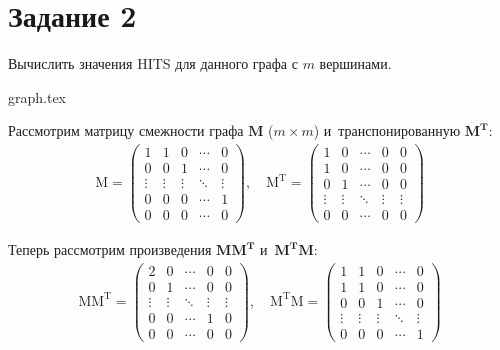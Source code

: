\documentclass[class=article,crop=false]{standalone}
\begin{document}
    \section*{Задание 2}
    Вычислить значения HITS для данного графа с $m$ вершинами.

    \begin{figure*}[h]
        \centering
        {graph.tex}
    \end{figure*}

    \noindent Рассмотрим матрицу смежности графа $\mathbf{M}$ ($m\times m$) и~транспонированную $\mathbf{M^T}$:
    \begin{gather*}
        \mathrm{M}=
        \begin{pmatrix}
            1      & 1      & 0      & \cdots & 0      \\
            0      & 0      & 1      & \cdots & 0      \\
            \vdots & \vdots & \vdots & \ddots & \vdots \\
            0      & 0      & 0      & \cdots & 1      \\
            0      & 0      & 0      & \cdots & 0
        \end{pmatrix},\quad
        \mathrm{M^T}=
        \begin{pmatrix}
            1      & 0      & \cdots & 0      & 0      \\
            1      & 0      & \cdots & 0      & 0      \\
            0      & 1      & \cdots & 0      & 0      \\
            \vdots & \vdots & \ddots & \vdots & \vdots \\
            0      & 0      & \cdots & 0      & 0
        \end{pmatrix}
    \end{gather*}

    \noindent Теперь рассмотрим произведения $\mathbf{M M^T}$ и~$\mathbf{M^T M}$:
    \begin{gather*}
        \mathrm{M M^T}=
        \begin{pmatrix}
            2      & 0      & \cdots & 0      & 0      \\
            0      & 1      & \cdots & 0      & 0      \\
            \vdots & \vdots & \ddots & \vdots & \vdots \\
            0      & 0      & \cdots & 1      & 0      \\
            0      & 0      & \cdots & 0      & 0
        \end{pmatrix},\quad
        \mathrm{M^T M}=
        \begin{pmatrix}
            1      & 1      & 0      & \cdots & 0      \\
            1      & 1      & 0      & \cdots & 0      \\
            0      & 0      & 1      & \cdots & 0      \\
            \vdots & \vdots & \vdots & \ddots & \vdots \\
            0      & 0      & 0      & \cdots & 1
        \end{pmatrix}
    \end{gather*}
\end{document}
